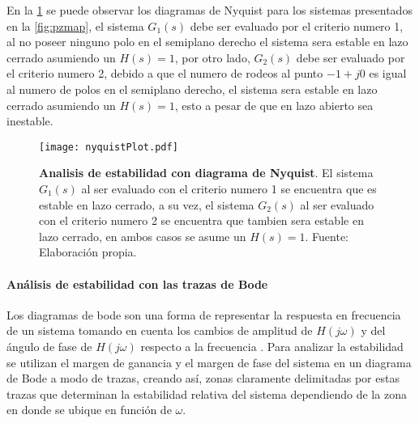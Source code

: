                 En la \cref{fig:nyquistPlot} se puede observar los diagramas de Nyquist para los sistemas presentados en la \cref{fig:pzmap}, el sistema $G_1(s)$ debe ser evaluado por el criterio numero 1, al no poseer ninguno polo en el semiplano derecho el sistema sera estable en lazo cerrado asumiendo un $H(s) = 1$, por otro lado, $G_2(s)$ debe ser evaluado por el criterio numero 2, debido a que el numero de rodeos al punto $-1 + j0$ es igual al numero de polos en el semiplano derecho, el sistema sera estable en lazo cerrado asumiendo un $H(s) = 1$, esto a pesar de que en lazo abierto sea inestable.

                \begin{figure}[htb]
                    \centering
                    \texttt{[image: nyquistPlot.pdf]}
                    \caption[Ejemplo de analisis de estabilidad con diagrama de Nyquist]{\textbf{Analisis de estabilidad con diagrama de Nyquist}. El sistema $G_1(s)$ al ser evaluado con el criterio numero 1 se encuentra que es estable en lazo cerrado, a su vez, el sistema $G_2(s)$ al ser evaluado con el criterio numero 2 se encuentra que tambien sera estable en lazo cerrado, en ambos casos se asume un $H(s) = 1$. Fuente: Elaboración propia.} 
                    \label{fig:nyquistPlot}
                \end{figure}

            
            \paragraph{Análisis de estabilidad con las trazas de Bode}

                Los diagramas de bode son una forma de representar la respuesta en frecuencia de un sistema tomando en cuenta los cambios de amplitud de $H(j\omega)$ y del ángulo de fase de $H(j\omega)$ respecto a la frecuencia \Parencite{nilsson1995circuitos}. Para analizar la estabilidad se utilizan el margen de ganancia y el margen de fase del sistema en un diagrama de Bode a modo de trazas, creando así, zonas claramente delimitadas por estas trazas que determinan la estabilidad relativa del sistema dependiendo de la zona en donde se ubique en función de $\omega$.